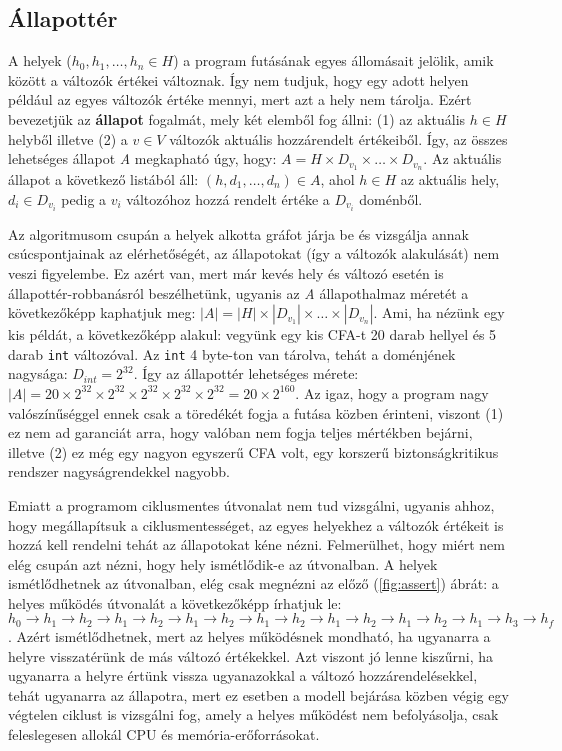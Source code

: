 \subsection{Állapottér}

A helyek ($ h_0, h_1, \ldots, h_n \in H $) a program futásának egyes állomásait jelölik, amik között a változók értékei változnak. Így nem tudjuk, hogy egy adott helyen például az egyes változók értéke mennyi, mert azt a hely nem tárolja. Ezért bevezetjük az \textbf{állapot} fogalmát, mely két elemből fog állni: (1) az aktuális $ h \in H $ helyből illetve (2) a $ v \in V $ változók aktuális hozzárendelt értékeiből. Így, az összes lehetséges állapot \textit{A} megkapható úgy, hogy: $ A = H \times D_{v_1} \times \ldots \times D_{v_n} $. Az aktuális állapot a következő listából áll: $ (h, d_1, \ldots, d_n) \in A $, ahol $ h \in H $ az aktuális hely, $ d_i \in D_{v_i} $ pedig a $ v_i $ változóhoz hozzá rendelt értéke a $ D_{v_i} $ doménből.

Az algoritmusom csupán a helyek alkotta gráfot járja be és vizsgálja annak csúcspontjainak az elérhetőségét, az állapotokat (így a változók alakulását) nem veszi figyelembe. Ez azért van, mert már kevés hely és változó esetén is állapottér-robbanásról beszélhetünk, ugyanis az \textit{A} állapothalmaz méretét a következőképp kaphatjuk meg: $ |A| = |H| \times |D_{v_1}| \times \ldots \times |D_{v_n}| $. Ami, ha nézünk egy kis példát, a következőképp alakul: vegyünk egy kis CFA-t 20 darab hellyel és 5 darab \texttt{int} változóval. Az \texttt{int} 4 byte-ton van tárolva, tehát a doménjének nagysága: $ D_{\mathit{int}} = 2^{32} $. Így az állapottér lehetséges mérete: $ |A| = 20 \times 2^{32} \times 2^{32} \times 2^{32} \times 2^{32} \times 2^{32} = 20 \times 2^{160} $. Az igaz, hogy a program nagy valószínűséggel ennek csak a töredékét fogja a futása közben érinteni, viszont (1) ez nem ad garanciát arra, hogy valóban nem fogja teljes mértékben bejárni, illetve (2) ez még egy nagyon egyszerű CFA volt, egy korszerű biztonságkritikus rendszer nagyságrendekkel nagyobb.

Emiatt a programom ciklusmentes útvonalat nem tud vizsgálni, ugyanis ahhoz, hogy megállapítsuk a ciklusmentességet, az egyes helyekhez a változók értékeit is hozzá kell rendelni tehát az állapotokat kéne nézni. Felmerülhet, hogy miért nem elég csupán azt nézni, hogy hely ismétlődik-e az útvonalban. A helyek ismétlődhetnek az útvonalban, elég csak megnézni az előző (\ref{fig:assert}) ábrát: a helyes működés útvonalát a következőképp írhatjuk le: $ h_0 \rightarrow h_1 \rightarrow h_2 \rightarrow h_1 \rightarrow h_2 \rightarrow h_1 \rightarrow h_2 \rightarrow h_1 \rightarrow h_2 \rightarrow h_1 \rightarrow h_2 \rightarrow h_1 \rightarrow h_2 \rightarrow h_1 \rightarrow h_3 \rightarrow h_f $. Azért ismétlődhetnek, mert az helyes működésnek mondható, ha ugyanarra a helyre visszatérünk de más változó értékekkel. Azt viszont jó lenne kiszűrni, ha ugyanarra a helyre értünk vissza ugyanazokkal a változó hozzárendelésekkel, tehát ugyanarra az állapotra, mert ez esetben a modell bejárása közben végig egy végtelen ciklust is vizsgálni fog, amely a helyes működést nem befolyásolja, csak feleslegesen allokál CPU és memória-erőforrásokat.

